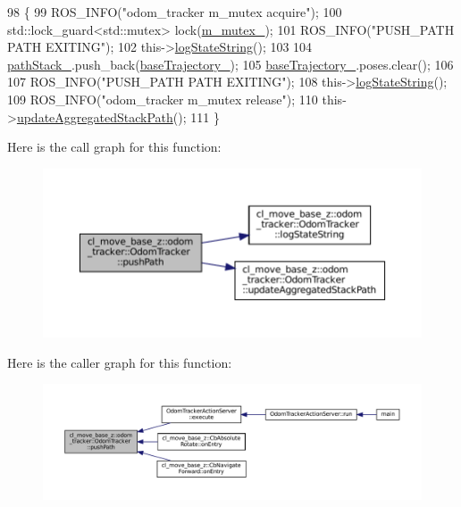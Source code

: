 \begin{DoxyCode}
98 \{
99   ROS\_INFO(\textcolor{stringliteral}{"odom\_tracker m\_mutex acquire"});
100   std::lock\_guard<std::mutex> lock(\hyperlink{classcl__move__base__z_1_1odom__tracker_1_1OdomTracker_aa371639e1eee269273dec8d3ab9dba0f}{m\_mutex\_});
101   ROS\_INFO(\textcolor{stringliteral}{"PUSH\_PATH PATH EXITING"});
102   this->\hyperlink{classcl__move__base__z_1_1odom__tracker_1_1OdomTracker_a6d0b450474d9d555205ff4281965164e}{logStateString}();
103 
104   \hyperlink{classcl__move__base__z_1_1odom__tracker_1_1OdomTracker_a1ccad1b568b6c65da43ba6639b6bd1ef}{pathStack\_}.push\_back(\hyperlink{classcl__move__base__z_1_1odom__tracker_1_1OdomTracker_a466d18a86df049f0f680e043bb5ea91f}{baseTrajectory\_});
105   \hyperlink{classcl__move__base__z_1_1odom__tracker_1_1OdomTracker_a466d18a86df049f0f680e043bb5ea91f}{baseTrajectory\_}.poses.clear();
106 
107   ROS\_INFO(\textcolor{stringliteral}{"PUSH\_PATH PATH EXITING"});
108   this->\hyperlink{classcl__move__base__z_1_1odom__tracker_1_1OdomTracker_a6d0b450474d9d555205ff4281965164e}{logStateString}();
109   ROS\_INFO(\textcolor{stringliteral}{"odom\_tracker m\_mutex release"});
110   this->\hyperlink{classcl__move__base__z_1_1odom__tracker_1_1OdomTracker_a7922f1e1e688a2ed62d32d9914985a9f}{updateAggregatedStackPath}();
111 \}
\end{DoxyCode}
Here is the call graph for this function\+:
\nopagebreak
\begin{figure}[H]
\begin{center}
\leavevmode
\includegraphics[width=350pt]{classcl__move__base__z_1_1odom__tracker_1_1OdomTracker_a205ee48ec8b4599658e7408fc4755239_cgraph}
\end{center}
\end{figure}
Here is the caller graph for this function\+:
\nopagebreak
\begin{figure}[H]
\begin{center}
\leavevmode
\includegraphics[width=350pt]{classcl__move__base__z_1_1odom__tracker_1_1OdomTracker_a205ee48ec8b4599658e7408fc4755239_icgraph}
\end{center}
\end{figure}
